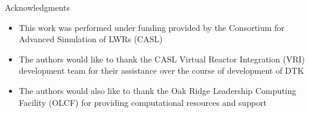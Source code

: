 \documentclass{beamer}
\begin{document}
\begin{frame}{Acknowledgments}

  \begin{itemize}
  \item This work was performed under funding provided by the
    Consortium for Advanced Simulation of LWRs (CASL)
    \bigskip
  \item The authors would like to thank the CASL Virtual Reactor
    Integration (VRI) development team for their assistance over the
    course of development of DTK
    \bigskip
  \item The authors would also like to thank the Oak Ridge Leadership
    Computing Facility (OLCF) for providing computational resources
    and support
  \end{itemize}

\end{frame}

\end{document}
